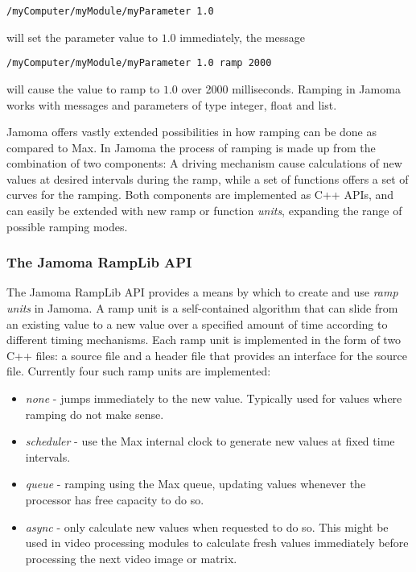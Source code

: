 \documentclass{sig-alternate}
\begin{document}
\texttt{/myComputer/myModule/myParameter 1.0}

will set the parameter value to $1.0$ immediately, the message

\texttt{/myComputer/myModule/myParameter 1.0 ramp 2000}

will cause the value to ramp to $1.0$ over 2000 milliseconds. Ramping in Jamoma works with messages and parameters of type integer, float and list.

Jamoma offers vastly extended possibilities in how ramping can be done as compared to Max. In Jamoma the process of ramping is made up from the combination of two components: A driving mechanism cause calculations of new values at desired intervals during the ramp, while a set of functions offers a set of curves for the ramping. Both components are implemented as C++ APIs, and can easily be extended with new ramp or function \emph{units}, expanding the range of possible ramping modes.



\subsubsection{The Jamoma RampLib API} %
\label{ssub:the_ramp_lib}

The Jamoma RampLib API provides a means by which to create and use \emph{ramp units} in Jamoma.  A ramp unit is a self-contained algorithm that can slide from an existing value to a new value over a specified amount of time according to different timing mechanisms. Each ramp unit is implemented in the form of two C++ files: a source file and a header file that provides an interface for the source file. Currently four such ramp units are implemented:

\begin{itemize}

	\item \emph{none} - jumps immediately to the new value. Typically used for values where ramping do not make sense.

	\item \emph{scheduler} - use the Max internal clock to generate new values at fixed time intervals.

	\item \emph{queue} - ramping using the Max queue, updating values whenever the processor has free capacity to do so.

	\item \emph{async} - only calculate new values when requested to do so. This might be used in video processing modules to calculate fresh values immediately before processing the next video image or matrix.
	
\end{itemize}
\end{document}
